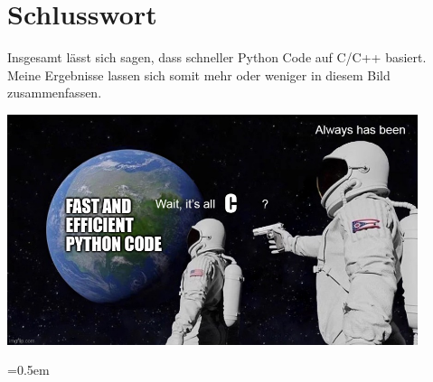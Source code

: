 \documentclass[11pt,a4paper]{article}
\begin{document}
\section{Schlusswort}
Insgesamt lässt sich sagen, dass schneller Python Code auf C/C++ basiert.
Meine Ergebnisse lassen sich somit mehr oder weniger in diesem Bild zusammenfassen.

\begin{center}
    \includegraphics[width=0.9\textwidth]{diagramme/memepy.jpg}
\end{center}


\clearpage

\emergencystretch=0.5em

\printbibliography[title={Literaturverzeichnis}]
\end{document}
